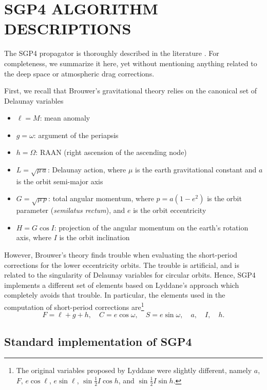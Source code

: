 \documentclass{article}
\begin{document}


\section{SGP4 ALGORITHM DESCRIPTIONS}
\label{sec:algorithms}

The SGP4 propagator is thoroughly described in the literature \cite{HootsRoehrich1980,ValladoCrawfordHujsakKelso2006}. For completeness, we summarize it here, yet without mentioning anything related to the deep space or atmospheric drag corrections.

First, we recall that Brouwer's gravitational theory relies on the canonical set of Delaunay variables
\begin{itemize} \itemsep0em
\item $\ell=M$: mean anomaly
\item $g=\omega$: argument of the periapsis
\item $h=\Omega$: RAAN (right ascension of the ascending node)
\item $L=\sqrt{\mu\,a}$: Delaunay action, where $\mu$ is the earth gravitational constant and $a$ is the orbit semi-major axis
\item $G=\sqrt{\mu\,p}$: total angular momentum, where $p=a(1-e^2)$ is the orbit parameter (\textit{semilatus rectum}), and $e$ is the orbit eccentricity
\item $H=G\cos{I}$: projection of the angular momentum on the earth's rotation axis, where $I$ is the orbit inclination
\end{itemize}
However, Brouwer's theory finds trouble when evaluating the short-period corrections for the lower eccentricity orbits. The trouble is artificial, and is related to the singularity of Delaunay variables for circular orbits. Hence,
SGP4 implements a different set of elements based on Lyddane's approach which completely avoids that trouble. In particular, the elements used in the computation of short-period corrections are\footnote{The original variables proposed by Lyddane were slightly different, namely $a$, $F$, $e\cos\ell$, $e\sin\ell$, $\sin\frac{1}{2}I\cos{h}$, and $\sin\frac{1}{2}I\sin{h}$. }
\[
F=\ell+g+h, \quad C=e\cos\omega, \quad S=e\sin\omega, \quad a, \quad I, \quad h.
\]

\subsection{Standard implementation of SGP4} \label{sec:vallado}
\end{document}
